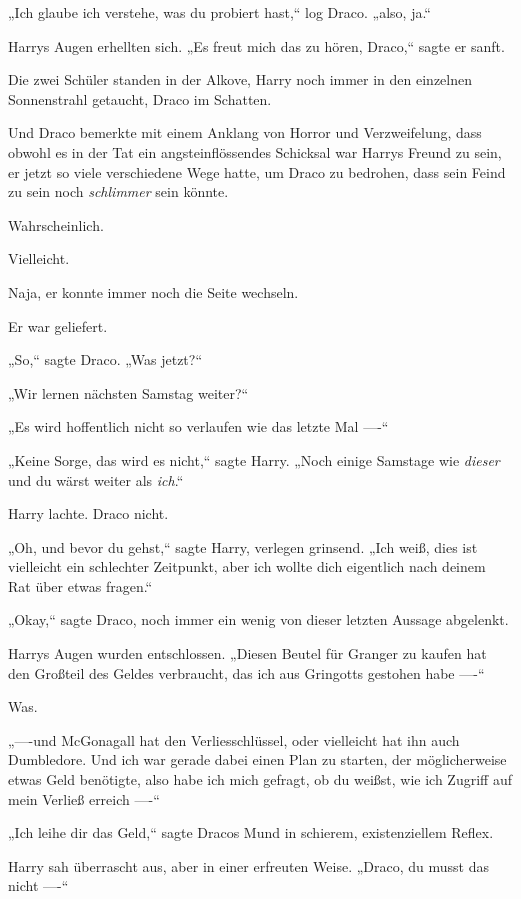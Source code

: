 {„Ich glaube ich verstehe, was du probiert hast,“ log Draco. „also, ja.“

Harrys Augen erhellten sich. „Es freut mich das zu hören, Draco,“ sagte er sanft.

Die zwei Schüler standen in der Alkove, Harry noch immer in den einzelnen Sonnenstrahl getaucht, Draco im Schatten.

Und Draco bemerkte mit einem Anklang von Horror und Verzweifelung, dass obwohl es in der Tat ein angsteinflössendes Schicksal war Harrys Freund zu sein, er jetzt so viele verschiedene Wege hatte, um Draco zu bedrohen, dass sein Feind zu sein noch \emph{schlimmer} sein könnte.

Wahrscheinlich.

Vielleicht.

Naja, er konnte immer noch die Seite wechseln.

Er war geliefert.

„So,“ sagte Draco. „Was jetzt?“

„Wir lernen nächsten Samstag weiter?“

„Es wird hoffentlich nicht so verlaufen wie das letzte Mal ----“

„Keine Sorge, das wird es nicht,“ sagte Harry. „Noch einige Samstage wie \emph{dieser} und du wärst weiter als \emph{ich}.“

Harry lachte. Draco nicht.

„Oh, und bevor du gehst,“ sagte Harry, verlegen grinsend. „Ich weiß, dies ist vielleicht ein schlechter Zeitpunkt, aber ich wollte dich eigentlich nach deinem Rat über etwas fragen.“

„Okay,“ sagte Draco, noch immer ein wenig von dieser letzten Aussage abgelenkt.

Harrys Augen wurden entschlossen. „Diesen Beutel für Granger zu kaufen hat den Großteil des Geldes verbraucht, das ich aus Gringotts gestohen habe ----“

Was.

„----und McGonagall hat den Verliesschlüssel, oder vielleicht hat ihn auch Dumbledore. Und ich war gerade dabei einen Plan zu starten, der möglicherweise etwas Geld benötigte, also habe ich mich gefragt, ob du weißst, wie ich Zugriff auf mein Verließ erreich ----“

„Ich leihe dir das Geld,“ sagte Dracos Mund in schierem, existenziellem Reflex.

Harry sah überrascht aus, aber in einer erfreuten Weise. „Draco, du musst das nicht ----“

}
